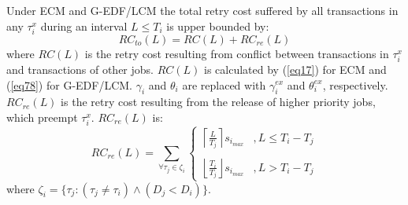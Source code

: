 \begin{clm}\label{ecm rlease conflict}
Under ECM and G-EDF/LCM the total retry cost suffered by all transactions in any $\tau_i^x$ during an interval $L\le T_i$ is upper bounded by:
\begin{equation}
RC_{to}(L)=RC(L)+RC_{re}(L)
\label{total rc ecm eq}
\end{equation}
where $RC(L)$ is the retry cost resulting from conflict between transactions in $\tau_i^x$ and transactions of other jobs. $RC(L)$ is calculated by (\ref{eq17}) for ECM and (\ref{eq78}) for G-EDF/LCM. $\gamma_i$ and $\theta_i$ are replaced with $\gamma_i^{ex}$ and $\theta_i^{ex}$, respectively. $RC_{re}(L)$ is the retry cost resulting from the release of higher priority jobs, which preempt $\tau_i^x$. $RC_{re}(L)$ is:
\begin{equation}
RC_{re}(L)=\sum_{\forall \tau_{j}\in\zeta_{i}}\begin{cases}
\left\lceil \frac{L}{T_{j}}\right\rceil s_{i_{max}} & ,L\le T_{i}-T_{j}\\\\
\left\lfloor \frac{T_{i}}{T_{j}}\right\rfloor s_{i_{max}} & ,L>T_{i}-T_{j}
\end{cases}\label{eq6}
\end{equation}
%
where $\zeta_i=\{\tau_j:\left(\tau_j \ne \tau_i\right)\wedge \left(D_j < D_i \right)\}$.
\end{clm}
